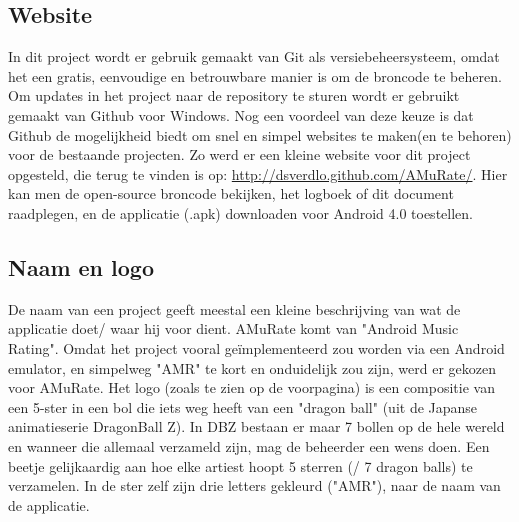\documentclass[11pt,a4paper]{article}
\begin{document}
	\subsection{Website}
		In dit project wordt er gebruik gemaakt van Git als versiebeheersysteem, omdat het een gratis, eenvoudige en betrouwbare manier is om de broncode te beheren. Om updates in het project naar de repository te sturen wordt er gebruikt gemaakt van Github voor Windows. Nog een voordeel van deze keuze is dat Github de mogelijkheid biedt om snel en simpel websites te maken(en te behoren) voor de bestaande projecten. Zo werd er een kleine website voor dit project opgesteld, die terug te vinden is op: \url{http://dsverdlo.github.com/AMuRate/}. Hier kan men de open-source broncode bekijken, het logboek of dit document raadplegen, en de applicatie (.apk) downloaden voor Android 4.0 toestellen.
	\subsection{Naam en logo}
		De naam van een project geeft meestal een kleine beschrijving van wat de applicatie doet/ waar hij voor dient. AMuRate komt van "Android Music Rating". Omdat het project vooral geïmplementeerd zou worden via een Android emulator, en simpelweg "AMR" te kort en onduidelijk zou zijn, werd er gekozen voor AMuRate. Het logo (zoals te zien op de voorpagina) is een compositie van een 5-ster in een bol die iets weg heeft van een "dragon ball" (uit de Japanse animatieserie DragonBall Z). In DBZ bestaan er maar 7 bollen op de hele wereld en wanneer die allemaal verzameld zijn, mag de beheerder een wens doen. Een beetje gelijkaardig aan hoe elke artiest hoopt 5 sterren (/ 7 dragon balls) te verzamelen. 
	In de ster zelf zijn drie letters gekleurd ("AMR"), naar de naam van de applicatie.
	
\end{document}
